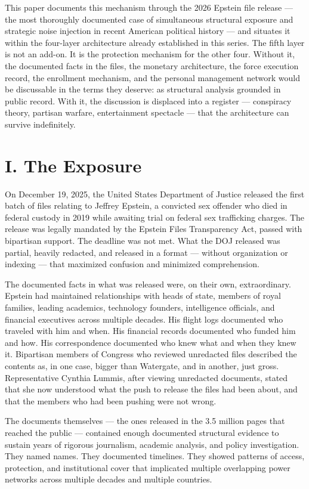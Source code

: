 \documentclass[11pt,a4paper]{article}
\begin{document}
This paper documents this mechanism through the 2026 Epstein file release — the most thoroughly documented case of simultaneous structural exposure and strategic noise injection in recent American political history — and situates it within the four-layer architecture already established in this series. The fifth layer is not an add-on. It is the protection mechanism for the other four. Without it, the documented facts in the files, the monetary architecture, the force execution record, the enrollment mechanism, and the personal management network would be discussable in the terms they deserve: as structural analysis grounded in public record. With it, the discussion is displaced into a register — conspiracy theory, partisan warfare, entertainment spectacle — that the architecture can survive indefinitely.


\section{I. The Exposure}

On December 19, 2025, the United States Department of Justice released the first batch of files relating to Jeffrey Epstein, a convicted sex offender who died in federal custody in 2019 while awaiting trial on federal sex trafficking charges. The release was legally mandated by the Epstein Files Transparency Act, passed with bipartisan support. The deadline was not met. What the DOJ released was partial, heavily redacted, and released in a format — without organization or indexing — that maximized confusion and minimized comprehension.


The documented facts in what was released were, on their own, extraordinary. Epstein had maintained relationships with heads of state, members of royal families, leading academics, technology founders, intelligence officials, and financial executives across multiple decades. His flight logs documented who traveled with him and when. His financial records documented who funded him and how. His correspondence documented who knew what and when they knew it. Bipartisan members of Congress who reviewed unredacted files described the contents as, in one case, bigger than Watergate, and in another, just gross. Representative Cynthia Lummis, after viewing unredacted documents, stated that she now understood what the push to release the files had been about, and that the members who had been pushing were not wrong.


The documents themselves — the ones released in the 3.5 million pages that reached the public — contained enough documented structural evidence to sustain years of rigorous journalism, academic analysis, and policy investigation. They named names. They documented timelines. They showed patterns of access, protection, and institutional cover that implicated multiple overlapping power networks across multiple decades and multiple countries.
\end{document}
